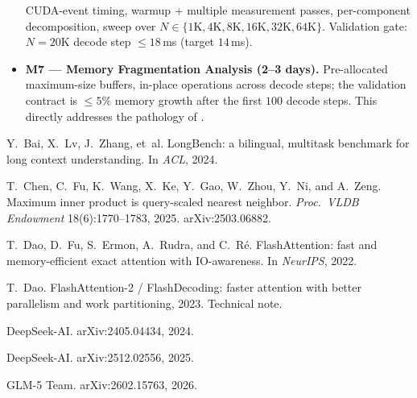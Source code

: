 \documentclass[11pt]{article}
\theoremstyle{definition}
\theoremstyle{remark}
\theoremstyle{plain}
\begin{document}
\begin{itemize}
    CUDA-event timing, warmup + multiple measurement passes, per-component
    decomposition, sweep over $N\in\{1\text{K},4\text{K},8\text{K},16\text{K},32\text{K},64\text{K}\}$.
    Validation gate: $N\!=\!20\text{K}$ decode step $\leq 18$\,ms (target $14$\,ms).
  \item \textbf{M7 — Memory Fragmentation Analysis (2--3 days).}
    Pre-allocated maximum-size buffers, in-place operations across decode steps;
    the validation contract is $\leq 5\%$ memory growth after the first $100$
    decode steps. This directly addresses the pathology of .
\end{itemize}

\begin{thebibliography}{40}

Y.~Bai, X.~Lv, J.~Zhang, et~al.
\newblock LongBench: a bilingual, multitask benchmark for long context understanding.
\newblock In \emph{ACL}, 2024.

T.~Chen, C.~Fu, K.~Wang, X.~Ke, Y.~Gao, W.~Zhou, Y.~Ni, and A.~Zeng.
\newblock Maximum inner product is query-scaled nearest neighbor.
\newblock \emph{Proc.\ VLDB Endowment} 18(6):1770--1783, 2025. arXiv:2503.06882.

T.~Dao, D.~Fu, S.~Ermon, A.~Rudra, and C.~R\'{e}.
\newblock FlashAttention: fast and memory-efficient exact attention with IO-awareness.
\newblock In \emph{NeurIPS}, 2022.

T.~Dao.
\newblock FlashAttention-2 / FlashDecoding: faster attention with better parallelism and work partitioning, 2023.
\newblock Technical note.

DeepSeek-AI.
\newblock arXiv:2405.04434, 2024.

DeepSeek-AI.
\newblock arXiv:2512.02556, 2025.

GLM-5 Team.
\newblock arXiv:2602.15763, 2026.


\end{thebibliography}
\end{document}
